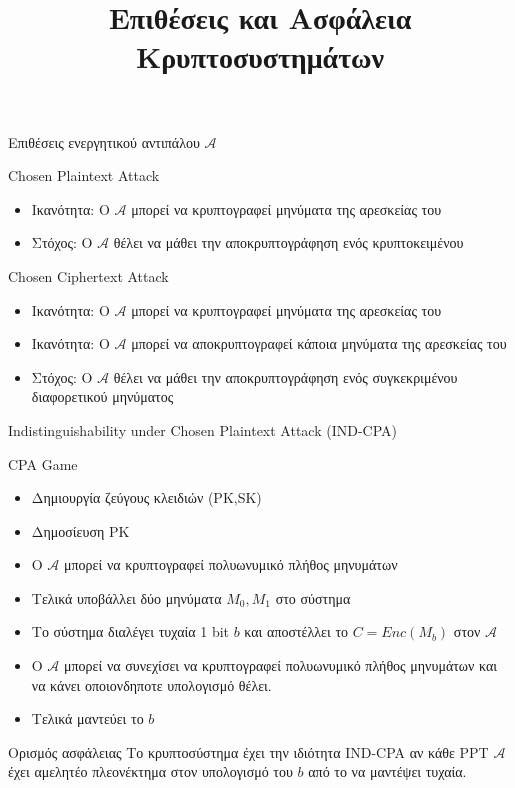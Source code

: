 \documentclass{beamer}
\title{Επιθέσεις και Ασφάλεια Κρυπτοσυστημάτων}
\begin{document}
\newcommand{\zns}[1]{ \mathbb{Z}_{#1}^* }
\newcommand{\zn}[1]{ \mathbb{Z}_{#1}}
\newcommand{\md}[1]{\quad (mod \, {#1})}
\newcommand{\adv}{\mathcal{A}}
 
\begin{frame}
\titlepage
\end{frame}

\begin{frame}{Επιθέσεις ενεργητικού αντιπάλου $\adv$} 

\begin{block}{Chosen Plaintext Attack}
\begin{itemize}
\item Ικανότητα: Ο $\adv$ μπορεί να κρυπτογραφεί μηνύματα της αρεσκείας του
\item Στόχος: Ο $\adv$ θέλει να μάθει την αποκρυπτογράφηση ενός κρυπτοκειμένου
\end{itemize}
\end{block}

\begin{block}{Chosen Ciphertext Attack}
\begin{itemize}
\item Ικανότητα: Ο $\adv$ μπορεί να κρυπτογραφεί μηνύματα της αρεσκείας του
\item Ικανότητα: Ο $\adv$ μπορεί να αποκρυπτογραφεί κάποια μηνύματα της αρεσκείας του
\item Στόχος: Ο $\adv$ θέλει να μάθει την αποκρυπτογράφηση ενός συγκεκριμένου διαφορετικού μηνύματος
\end{itemize}
\end{block}
\end{frame}

\begin{frame}{Indistinguishability under Chosen Plaintext Attack (IND-CPA)}

\begin{block}{CPA Game}
\begin{itemize}
\item Δημιουργία ζεύγους κλειδιών (PK,SK)
\item Δημοσίευση PK
\item Ο $\adv$ μπορεί να κρυπτογραφεί πολυωνυμικό πλήθος μηνυμάτων
\item Τελικά υποβάλλει δύο μηνύματα $ M_0, M_1 $  στο σύστημα
\item Το σύστημα διαλέγει τυχαία 1 bit $b$ και αποστέλλει το $C=Enc(M_b)$ στον $\adv$
\item Ο $\adv$ μπορεί να συνεχίσει να κρυπτογραφεί πολυωνυμικό πλήθος μηνυμάτων και να κάνει οποιονδηποτε υπολογισμό θέλει.
\item Τελικά μαντεύει το $b$
\end{itemize}
\end{block}

\begin{block}{Ορισμός ασφάλειας}
Το κρυπτοσύστημα έχει την ιδιότητα IND-CPA αν κάθε PPT $\adv$ έχει αμελητέο πλεονέκτημα στον υπολογισμό του $b$ από το να μαντέψει τυχαία.
\end{block}

\end{frame}
\end{document}
